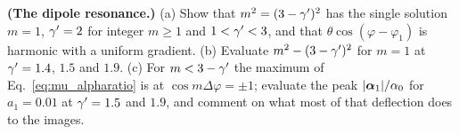 \begin{exercise}
\label{ex:mu_dipole}
\textbf{(The dipole resonance.)}
(a) Show that $m^2=(3-\gamma')^2$ has the single solution $m=1$, $\gamma'=2$
for integer $m\ge1$ and $1<\gamma'<3$, and that $\theta\cos(\varphi-\varphi_1)$
is harmonic with a uniform gradient.  (b) Evaluate $m^2-(3-\gamma')^2$ for
$m=1$ at $\gamma'=1.4$, $1.5$ and $1.9$.  (c) For $m<3-\gamma'$ the maximum of
Eq.~\eqref{eq:mu_alpharatio} is at $\cos m\Delta\varphi=\pm1$; evaluate
the peak $|\boldsymbol{\alpha}_1|/\alpha_0$ for $a_1=0.01$ at $\gamma'=1.5$ and
$1.9$, and comment on what most of that deflection does to the images.
\end{exercise}
